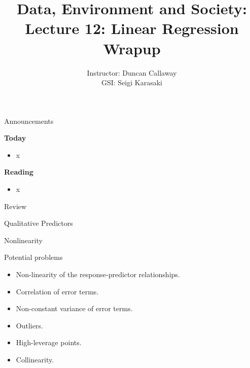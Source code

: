 \documentclass[aspectratio=169]{beamer}
\title[Lecture 12: Regression wrapup] %
{Data, Environment and Society: \\{Lecture 12: Linear Regression Wrapup}}
\author[ER190C: Data, Environment and Society] 
{Instructor: Duncan Callaway\\
GSI: Seigi Karasaki}
\institute[UC Berkeley] %
 {\small{ \bf October 2, 2018}}
\date[October 2, 2018]
\begin{document}
\begin{frame}
  \titlepage
\end{frame}

\begin{frame}{Announcements}

\textbf{Today}
\begin{itemize}
\item x
\end{itemize}

\textbf{Reading}
\begin{itemize}
\item x
\end{itemize}
\end{frame}


\begin{frame}{Review}

\end{frame}



\begin{frame}{Qualitative Predictors}
  
\end{frame}


\begin{frame}{Nonlinearity}
  
\end{frame}

\begin{frame}{Potential problems}
  \begin{itemize}
    \item Non-linearity of the response-predictor relationships. 
    \item Correlation of error terms.
    \item Non-constant variance of error terms.
    \item Outliers.
    \item High-leverage points.
    \item Collinearity.
  \end{itemize}
\end{frame}
\end{document}
